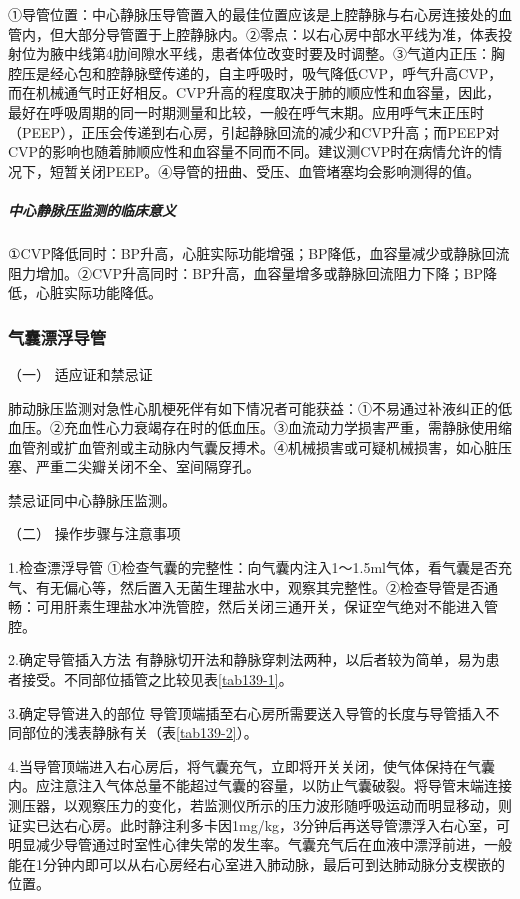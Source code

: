 ①导管位置：中心静脉压导管置入的最佳位置应该是上腔静脉与右心房连接处的血管内，但大部分导管置于上腔静脉内。②零点：以右心房中部水平线为准，体表投射位为腋中线第4肋间隙水平线，患者体位改变时要及时调整。③气道内正压：胸腔压是经心包和腔静脉壁传递的，自主呼吸时，吸气降低CVP，呼气升高CVP，而在机械通气时正好相反。CVP升高的程度取决于肺的顺应性和血容量，因此，最好在呼吸周期的同一时期测量和比较，一般在呼气末期。应用呼气末正压时（PEEP），正压会传递到右心房，引起静脉回流的减少和CVP升高；而PEEP对CVP的影响也随着肺顺应性和血容量不同而不同。建议测CVP时在病情允许的情况下，短暂关闭PEEP。④导管的扭曲、受压、血管堵塞均会影响测得的值。

\subparagraph{中心静脉压监测的临床意义}

①CVP降低同时：BP升高，心脏实际功能增强；BP降低，血容量减少或静脉回流阻力增加。②CVP升高同时：BP升高，血容量增多或静脉回流阻力下降；BP降低，心脏实际功能降低。

\subsubsection{气囊漂浮导管}

\hypertarget{text00376.htmlux5cux23CHP16-6-5-1}{}
（一） 适应证和禁忌证

肺动脉压监测对急性心肌梗死伴有如下情况者可能获益：①不易通过补液纠正的低血压。②充血性心力衰竭存在时的低血压。③血流动力学损害严重，需静脉使用缩血管剂或扩血管剂或主动脉内气囊反搏术。④机械损害或可疑机械损害，如心脏压塞、严重二尖瓣关闭不全、室间隔穿孔。

禁忌证同中心静脉压监测。

\hypertarget{text00376.htmlux5cux23CHP16-6-5-2}{}
（二） 操作步骤与注意事项

1.检查漂浮导管
①检查气囊的完整性：向气囊内注入1～1.5ml气体，看气囊是否充气、有无偏心等，然后置入无菌生理盐水中，观察其完整性。②检查导管是否通畅：可用肝素生理盐水冲洗管腔，然后关闭三通开关，保证空气绝对不能进入管腔。

2.确定导管插入方法
有静脉切开法和静脉穿刺法两种，以后者较为简单，易为患者接受。不同部位插管之比较见表\ref{tab139-1}。

3.确定导管进入的部位
导管顶端插至右心房所需要送入导管的长度与导管插入不同部位的浅表静脉有关（表\ref{tab139-2}）。

4.当导管顶端进入右心房后，将气囊充气，立即将开关关闭，使气体保持在气囊内。应注意注入气体总量不能超过气囊的容量，以防止气囊破裂。将导管末端连接测压器，以观察压力的变化，若监测仪所示的压力波形随呼吸运动而明显移动，则证实已达右心房。此时静注利多卡因1mg/kg，3分钟后再送导管漂浮入右心室，可明显减少导管通过时室性心律失常的发生率。气囊充气后在血液中漂浮前进，一般能在1分钟内即可以从右心房经右心室进入肺动脉，最后可到达肺动脉分支楔嵌的位置。

